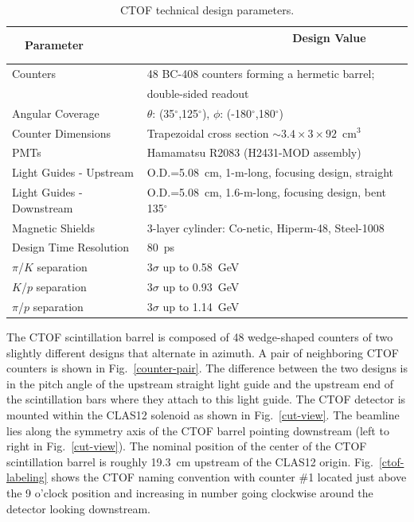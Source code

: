 \documentclass[12pt]{article}
\begin{document}
\begin{table}[htbp]
\begin{center}
\begin{tabular} {|l|l|} \hline
~~Parameter~~ &~~~~~~~~~~~~~~~~~~~~~~ Design Value ~~~~~~~~~~\\ \hline \hline
Counters           & 48 BC-408 counters forming a hermetic barrel; \\
                          & double-sided readout                   \\ \hline
Angular Coverage          & $\theta$: (35$^\circ$,125$^\circ$), $\phi$: (-180$^\circ$,180$^\circ$) \\ \hline
Counter Dimensions        & Trapezoidal cross section $\sim 3.4 \times 3 \times 92$~cm$^3$ \\ \hline
PMTs                      & Hamamatsu R2083 (H2431-MOD assembly)    \\ \hline
Light Guides - Upstream   & O.D.=5.08~cm, 1-m-long, focusing design, straight \\ \hline
Light Guides - Downstream & O.D.=5.08~cm, 1.6-m-long, focusing design, bent 135$^\circ$ \\ \hline
Magnetic Shields          & 3-layer cylinder: Co-netic, Hiperm-48, Steel-1008 \\ \hline
Design Time Resolution     & 80~ps \\ \hline
$\pi$/$K$ separation      & 3$\sigma$ up to 0.58~GeV \\ \hline
$K$/$p$ separation        & 3$\sigma$ up to 0.93~GeV \\ \hline
$\pi$/$p$ separation      & 3$\sigma$ up to 1.14~GeV \\ \hline
\end{tabular}
\end{center}
\caption{CTOF technical design parameters.}
\label{details}
\end{table}

The CTOF scintillation barrel is composed of 48 wedge-shaped counters of two slightly different designs
that alternate in azimuth. A pair of neighboring CTOF counters is shown in Fig.~\ref{counter-pair}. The
difference between the two designs is in the pitch angle of the upstream straight light guide and the
upstream end of the scintillation bars where they attach to this light guide. The CTOF detector is mounted
within the CLAS12 solenoid as shown in Fig.~\ref{cut-view}. The beamline lies along the symmetry axis of
the CTOF barrel pointing downstream (left to right in Fig.~\ref{cut-view}). The nominal position of the
center of the CTOF scintillation barrel is roughly 19.3~cm upstream of the CLAS12 origin. Fig.~\ref{ctof-labeling}
shows the CTOF naming convention with counter \#1 located just above the 9 o'clock position and increasing in
number going clockwise around the detector looking downstream.
\end{document}
